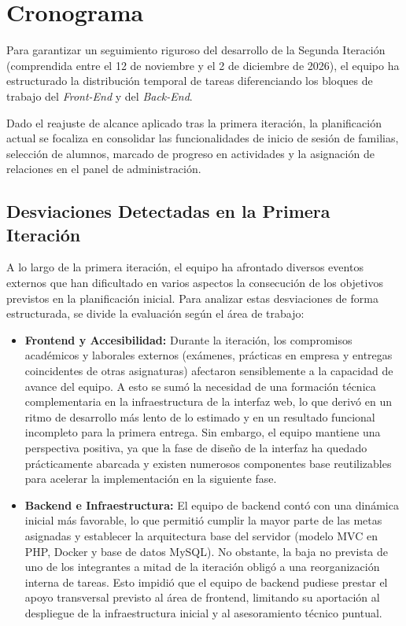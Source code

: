 \section{Cronograma}
Para garantizar un seguimiento riguroso del desarrollo de la Segunda Iteración (comprendida entre el 12 de noviembre y el 2 de diciembre de 2026), el equipo ha estructurado la distribución temporal de tareas diferenciando los bloques de trabajo del \textit{Front-End} y del \textit{Back-End}. 

Dado el reajuste de alcance aplicado tras la primera iteración, la planificación actual se focaliza en consolidar las funcionalidades de inicio de sesión de familias, selección de alumnos, marcado de progreso en actividades y la asignación de relaciones en el panel de administración. 
\subsection{Desviaciones Detectadas en la Primera Iteración}

A lo largo de la primera iteración, el equipo ha afrontado diversos eventos externos que han dificultado en varios aspectos la consecución de los objetivos previstos en la planificación inicial. Para analizar estas desviaciones de forma estructurada, se divide la evaluación según el área de trabajo:

\begin{itemize}
    \item \textbf{Frontend y Accesibilidad:} Durante la iteración, los compromisos académicos y laborales externos (exámenes, prácticas en empresa y entregas coincidentes de otras asignaturas) afectaron sensiblemente a la capacidad de avance del equipo. A esto se sumó la necesidad de una formación técnica complementaria en la infraestructura de la interfaz web, lo que derivó en un ritmo de desarrollo más lento de lo estimado y en un resultado funcional incompleto para la primera entrega. Sin embargo, el equipo mantiene una perspectiva positiva, ya que la fase de diseño de la interfaz ha quedado prácticamente abarcada y existen numerosos componentes base reutilizables para acelerar la implementación en la siguiente fase.
    
    \item \textbf{Backend e Infraestructura:} El equipo de backend contó con una dinámica inicial más favorable, lo que permitió cumplir la mayor parte de las metas asignadas y establecer la arquitectura base del servidor (modelo MVC en PHP, Docker y base de datos MySQL). No obstante, la baja no prevista de uno de los integrantes a mitad de la iteración obligó a una reorganización interna de tareas. Esto impidió que el equipo de backend pudiese prestar el apoyo transversal previsto al área de frontend, limitando su aportación al despliegue de la infraestructura inicial y al asesoramiento técnico puntual.
\end{itemize}

